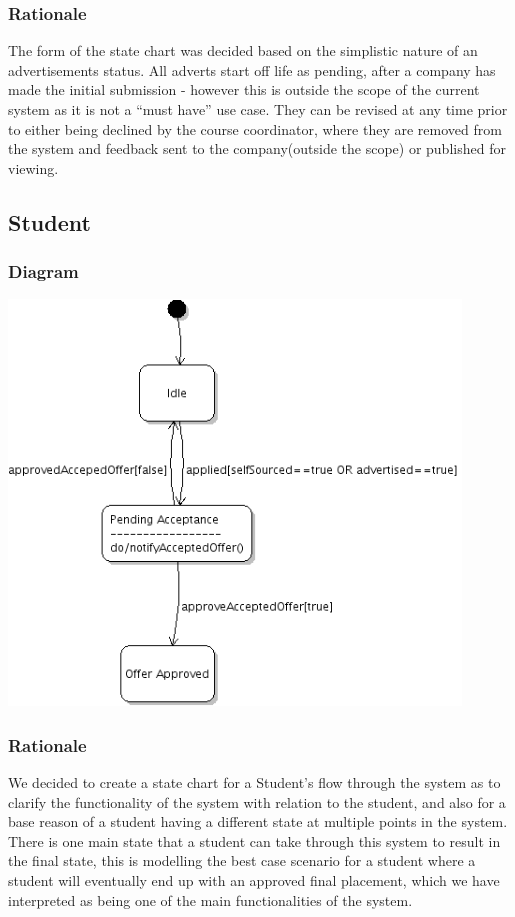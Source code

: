 \documentclass[11pt]{l3deliverable}
\begin{document}
\subsubsection{Rationale}

The form of the state chart was decided based on the simplistic nature of an 
advertisements status. All adverts start off life as pending, after a company
has made the initial submission - however this is outside the scope of
the current system as it is not a ``must have'' use case. They can be
revised at any time prior to either being declined by the course
coordinator, where they are removed from the system and feedback sent
to the company(outside the scope) or published for viewing.

\subsection{Student}

\subsubsection{Diagram}

\includegraphics[width=0.9\textwidth]{studentState.png}

\subsubsection{Rationale}

We decided to create a state chart for a Student's flow through the
system as to clarify the functionality of the system with relation to
the student, and also for a base reason of a student having a
different state at multiple points in the system. There is one main
state that a student can take through this system to result in the
final state, this is modelling the best case scenario for a student
where a student will eventually end up with an approved final
placement, which we have interpreted as being one of the main
functionalities of the system. 
\end{document}

